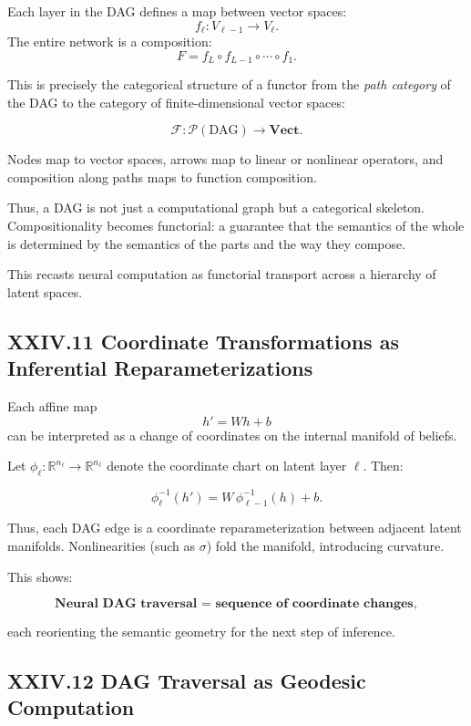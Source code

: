 \documentclass[11pt,letterpaper]{article}
\begin{document}
Each layer in the DAG defines a map between vector spaces:
\[
f_\ell : V_{\ell-1} \to V_\ell.
\]
The entire network is a composition:
\[
F = f_L \circ f_{L-1} \circ \cdots \circ f_1.
\]

This is precisely the categorical structure of a functor from the \emph{path category} of the DAG to the category of finite-dimensional vector spaces:

\[
\mathcal{F} : \mathcal{P}(\text{DAG}) \to \mathbf{Vect}.
\]

Nodes map to vector spaces, arrows map to linear or nonlinear operators, and composition along paths maps to function composition.

Thus, a DAG is not just a computational graph but a categorical skeleton. Compositionality becomes functorial: a guarantee that the semantics of the whole is determined by the semantics of the parts and the way they compose.

This recasts neural computation as functorial transport across a hierarchy of latent spaces.

\subsection{XXIV.11 Coordinate Transformations as Inferential Reparameterizations}

Each affine map
\[
h' = W h + b
\]
can be interpreted as a change of coordinates on the internal manifold of beliefs.

Let $\phi_\ell : \mathbb{R}^{n_\ell} \to \mathbb{R}^{n_\ell}$ denote the coordinate chart on latent layer $\ell$. Then:

\[
\phi_\ell^{-1}(h') = W\, \phi_{\ell-1}^{-1}(h) + b.
\]

Thus, each DAG edge is a coordinate reparameterization between adjacent latent manifolds.  
Nonlinearities (such as $\sigma$) fold the manifold, introducing curvature.

This shows:

\[
\textbf{Neural DAG traversal = sequence of coordinate changes},
\]

each reorienting the semantic geometry for the next step of inference.

\subsection{XXIV.12 DAG Traversal as Geodesic Computation}
\end{document}
